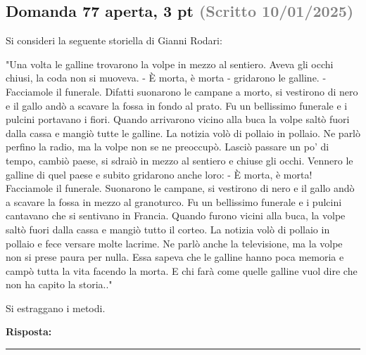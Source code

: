 \documentclass[a4paper,11pt]{article}
\begin{document}
\subsection*{Domanda 77 \hfill {\small aperta, 3 pt \textcolor{gray}{(Scritto 10/01/2025)}}}
\begin{tcolorbox}[colback=gray!8,colframe=gray!50,title=Contesto]
Si consideri la seguente storiella di Gianni Rodari:

"Una volta le galline trovarono la volpe in mezzo al sentiero. Aveva gli occhi chiusi, la coda non si muoveva. - È morta, è morta - gridarono le galline. - Facciamole il funerale. Difatti suonarono le campane a morto, si vestirono di nero e il gallo andò a scavare la fossa in fondo al prato. Fu un bellissimo funerale e i pulcini portavano i fiori. Quando arrivarono vicino alla buca la volpe saltò fuori dalla cassa e mangiò tutte le galline.
La notizia volò di pollaio in pollaio. Ne parlò perfino la radio, ma la volpe non se ne preoccupò. Lasciò passare un po' di tempo, cambiò paese, si sdraiò in mezzo al sentiero e chiuse gli occhi. Vennero le galline di quel paese e subito gridarono anche loro: - È morta, è morta! Facciamole il funerale.
Suonarono le campane, si vestirono di nero e il gallo andò a scavare la fossa in mezzo al granoturco. Fu un bellissimo funerale e i pulcini cantavano che si sentivano in Francia. Quando furono vicini alla buca, la volpe saltò fuori dalla cassa e mangiò tutto il corteo.
La notizia volò di pollaio in pollaio e fece versare molte lacrime. Ne parlò anche la televisione, ma la volpe non si prese paura per nulla. Essa sapeva che le galline hanno poca memoria e campò tutta la vita facendo la morta. E chi farà come quelle galline vuol dire che non ha capito la storia.."
\end{tcolorbox}
Si estraggano i metodi.

\vspace{0.2cm}
\noindent\textbf{Risposta:}\par
\vspace{4cm}\hrule


\end{document}
